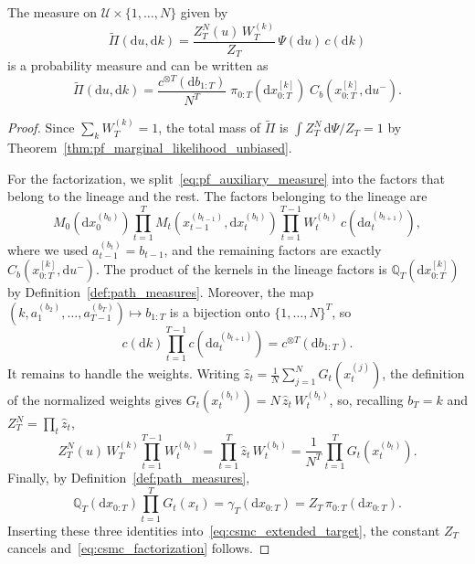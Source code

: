 \begin{lemma}
    \label{lem:csmc_extended_target}
    The measure on $\mathcal{U}\times\{1,\ldots,N\}$ given by
    \begin{equation}
        \tilde{\Pi}(\mathrm{d}u,\mathrm{d}k) = \frac{Z_T^N(u)\,W_T^{(k)}}{Z_T}\,\Psi(\mathrm{d}u)\,c(\mathrm{d}k)
        \label{eq:csmc_extended_target}
    \end{equation}
    is a probability measure and can be written as
    \begin{equation}
        \tilde{\Pi}(\mathrm{d}u,\mathrm{d}k) = \frac{c^{\otimes T}(\mathrm{d}b_{1:T})}{N^T}\;\pi_{0:T}\left(\mathrm{d}x_{0:T}^{[k]}\right)\;C_b\left(x_{0:T}^{[k]},\mathrm{d}u^-\right).
        \label{eq:csmc_factorization}
    \end{equation}
\end{lemma}
\begin{proof}
    Since $\sum_kW_T^{(k)} = 1$, the total mass of $\tilde{\Pi}$ is $\int Z_T^N\,\mathrm{d}\Psi/Z_T = 1$ by Theorem~\ref{thm:pf_marginal_likelihood_unbiased}.

    For the factorization, we split~\eqref{eq:pf_auxiliary_measure} into the factors that belong to the lineage and the rest. The factors belonging to the lineage are
    \begin{equation}
        M_0(\mathrm{d}x_0^{(b_0)})\prod_{t=1}^{T}M_t\left(x_{t-1}^{(b_{t-1})},\mathrm{d}x_t^{(b_t)}\right)\prod_{t=1}^{T-1}W_t^{(b_t)}\,c(\mathrm{d}a_t^{(b_{t+1})}),
    \end{equation}
    where we used $a_{t-1}^{(b_t)} = b_{t-1}$, and the remaining factors are exactly $C_b(x_{0:T}^{[k]},\mathrm{d}u^-)$. The product of the kernels in the lineage factors is $\mathbb{Q}_T(\mathrm{d}x_{0:T}^{[k]})$ by Definition~\ref{def:path_measures}. Moreover, the map $(k,a_1^{(b_2)},\ldots,a_{T-1}^{(b_T)})\mapsto b_{1:T}$ is a bijection onto $\{1,\ldots,N\}^T$, so
    \begin{equation}
        c(\mathrm{d}k)\prod_{t=1}^{T-1}c(\mathrm{d}a_t^{(b_{t+1})}) = c^{\otimes T}(\mathrm{d}b_{1:T}).
    \end{equation}
    It remains to handle the weights. Writing $\hat{z}_t = \frac{1}{N}\sum_{j=1}^{N}G_t(x_t^{(j)})$, the definition of the normalized weights gives $G_t(x_t^{(b_t)}) = N\,\hat{z}_t\,W_t^{(b_t)}$, so, recalling $b_T = k$ and $Z_T^N = \prod_t\hat{z}_t$,
    \begin{equation}
        Z_T^N(u)\,W_T^{(k)}\prod_{t=1}^{T-1}W_t^{(b_t)} = \prod_{t=1}^{T}\hat{z}_t\,W_t^{(b_t)} = \frac{1}{N^T}\prod_{t=1}^{T}G_t\left(x_t^{(b_t)}\right).
    \end{equation}
    Finally, by Definition~\ref{def:path_measures},
    \begin{equation}
        \mathbb{Q}_T(\mathrm{d}x_{0:T})\prod_{t=1}^{T}G_t(x_t) = \gamma_T(\mathrm{d}x_{0:T}) = Z_T\,\pi_{0:T}(\mathrm{d}x_{0:T}).
    \end{equation}
    Inserting these three identities into~\eqref{eq:csmc_extended_target}, the constant $Z_T$ cancels and~\eqref{eq:csmc_factorization} follows.
\end{proof}

